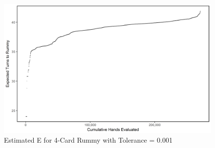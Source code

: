 \documentclass[paper=a4, fontsize=11pt,twoside]{report}   %
\begin{document}
\begin{figure}
\includegraphics[width=\textwidth]{fig10.png}
\caption{Estimated E for 4-Card Rummy with Tolerance = 0.001}\label{fig:10}
\end{figure}



\end{document}
